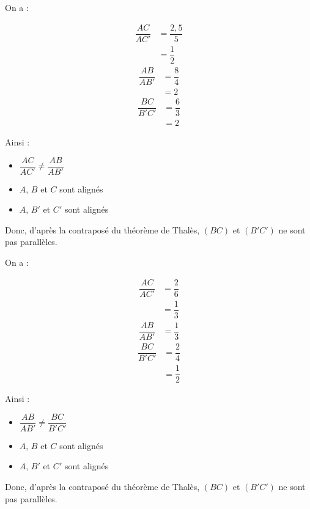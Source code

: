 \begin{multicols}{2}
    \exo{}{} On a : \vspace{-0.5em}
    \begin{multicols}{3}
        \noindent
        \begin{align*}
            \dfrac{AC}{AC'}&=\dfrac{2,5}{5}\\
            &=\dfrac{1}{2}
        \end{align*}
        \begin{align*}
            \dfrac{AB}{AB'}&=\dfrac{8}{4}\\
            &=2
        \end{align*}
        \begin{align*}
            \dfrac{BC}{B'C'}&=\dfrac{6}{3}\\
            &=2
        \end{align*}
    \end{multicols}
    \vspace{-1.75em }
    Ainsi :
    \begin{itemize}
        \item $\dfrac{AC}{AC'}\neq\dfrac{AB}{AB'}$\vspace{0.25em}
        \item $A$, $B$ et $C$ sont alignés
        \item $A$, $B'$ et $C'$ sont alignés
    \end{itemize}
    Donc, d'après la contraposé du théorème de Thalès, $(BC)$ et $(B'C')$ ne sont pas parallèles.

    \exo{}{} On a : \vspace{-0.5em}\
    \begin{multicols}{3}
        \noindent
        \begin{align*}
            \dfrac{AC}{AC'}&=\dfrac{2}{6}\\
            &=\dfrac{1}{3}
        \end{align*}
        \begin{align*}
            \dfrac{AB}{AB'}&=\dfrac{1}{3}
        \end{align*}
        \begin{align*}
            \dfrac{BC}{B'C'}&=\dfrac{2}{4}\\
            &=\dfrac{1}{2}
        \end{align*}
    \end{multicols}
    \vspace{-1.75em }
    Ainsi :
    \begin{itemize}
        \item $\dfrac{AB}{AB'}\neq\dfrac{BC}{B'C'}$\vspace{0.25em}
        \item $A$, $B$ et $C$ sont alignés
        \item $A$, $B'$ et $C'$ sont alignés
    \end{itemize}
    Donc, d'après la contraposé du théorème de Thalès, $(BC)$ et $(B'C')$ ne sont pas parallèles.
  \end{multicols}

